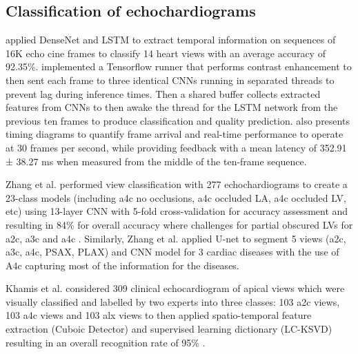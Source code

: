 \documentclass[mlabstract,twocolumn]{jmlr}
\begin{document}
\subsection{Classification of echochardiograms}
\citet{woudenberg2018} applied DenseNet and LSTM to extract temporal information on sequences of 16K echo cine frames to classify 14 heart views with an average accuracy of 92.35\%.
\citet{woudenberg2018} implemented a Tensorflow runner that performs contrast enhancement to then sent each frame to three identical CNNs running in separated threads to prevent lag during inference times.
Then a shared buffer collects extracted features from CNNs to then awake the thread for the LSTM network from the previous ten frames to produce classification and quality prediction.
\citet{woudenberg2018} also presents timing diagrams to quantify frame arrival and real-time performance to operate at 30 frames per second, while providing feedback with a mean latency of 352.91 ± 38.27 ms when measured from the middle of the ten-frame sequence.

Zhang et al. performed view classification with 277 echochardiograms to create a 23-class models (including a4c no occlusions, a4c occluded LA, a4c occluded LV, etc) using 13-layer CNN with 5-fold cross-validation for accuracy assessment and resulting in 84\% for overall accuracy where challenges for partial obscured LVs for a2c, a3c and a4c \citep{zhang2018}.
Similarly, Zhang et al. applied U-net to segment 5 views (a2c, a3c, a4c, PSAX, PLAX) and CNN model for 3 cardiac diseases with the use of A4c capturing most of the information for the diseases.

Khamis et al. considered 309 clinical echocardiogram of apical views which were visually classified and labelled by two experts into three classes: 103 a2c views, 103 a4c views and 103 alx views to then applied spatio-temporal feature extraction (Cuboic Detector) and supervised learning dictionary (LC-KSVD) resulting in an overall recognition rate of 95\% \citep{khamis2017}.
\end{document}
